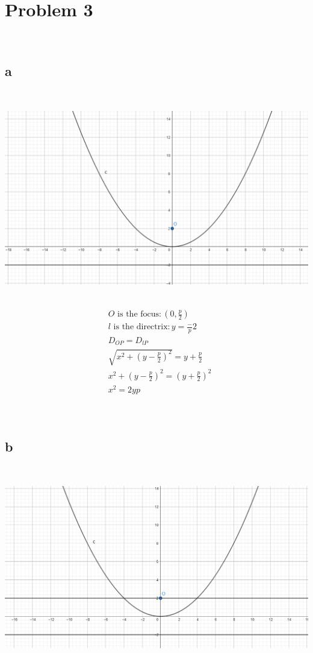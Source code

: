 \documentclass{article}
\begin{document}
\newpage

\section*{Problem 3}

~

\subsection*{a}

~

\includegraphics[scale=0.3]{HW_0307/3a.png}

~
\begin{align*}
        &O\text{ is the focus}:(0,\frac{p}{2})\\
        &l\text{ is the directrix}: y=\frac-{p}{2}\\
        &D_{OP}=D_{lP}\\
        &\sqrt{x^2+(y-\frac{p}{2})^2}=y+\frac{p}{2}\\
        &x^2+(y-\frac{p}{2})^2=(y+\frac{p}{2})^2\\
        &x^2=2yp\\
\end{align*}

~

\subsection*{b}

~

\includegraphics[scale=0.3]{HW_0307/3b.png}
\end{document}
